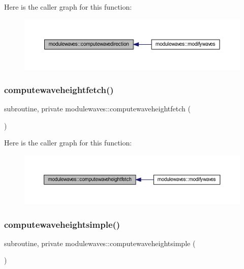 Here is the caller graph for this function\+:\nopagebreak
\begin{figure}[H]
\begin{center}
\leavevmode
\includegraphics[width=350pt]{namespacemodulewaves_ad48d7252dffb5d91c6b1bd578279b9f6_icgraph}
\end{center}
\end{figure}
\mbox{\label{namespacemodulewaves_a13f51790900a5a9f5a5b30632d881229}} 
\subsubsection{\texorpdfstring{computewaveheightfetch()}{computewaveheightfetch()}}
{\footnotesize\ttfamily subroutine, private modulewaves\+::computewaveheightfetch (\begin{DoxyParamCaption}{ }\end{DoxyParamCaption})\hspace{0.3cm}{\ttfamily [private]}}

Here is the caller graph for this function\+:\nopagebreak
\begin{figure}[H]
\begin{center}
\leavevmode
\includegraphics[width=350pt]{namespacemodulewaves_a13f51790900a5a9f5a5b30632d881229_icgraph}
\end{center}
\end{figure}
\mbox{\label{namespacemodulewaves_af86c07d276fd3f5fe89a2adc94d0518f}} 
\subsubsection{\texorpdfstring{computewaveheightsimple()}{computewaveheightsimple()}}
{\footnotesize\ttfamily subroutine, private modulewaves\+::computewaveheightsimple (\begin{DoxyParamCaption}{ }\end{DoxyParamCaption})\hspace{0.3cm}{\ttfamily [private]}}

